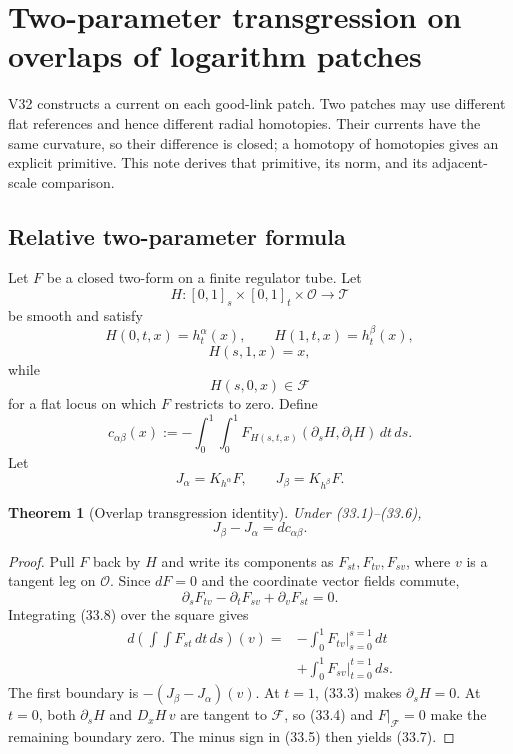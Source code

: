 \documentclass[11pt]{article}
\newtheorem{theorem}{Theorem}[section]
\begin{document}
\section{Two-parameter transgression on overlaps of logarithm patches}
\label{sec:v11v33}

V32 constructs a current on each good-link patch.  Two patches may use
different flat references and hence different radial homotopies.  Their
currents have the same curvature, so their difference is closed; a
homotopy of homotopies gives an explicit primitive.  This note derives
that primitive, its norm, and its adjacent-scale comparison.

\subsection{Relative two-parameter formula}

Let \(F\) be a closed two-form on a finite regulator tube.  Let
\[
 H:[0,1]_s\times[0,1]_t\times\mathcal O\longrightarrow\mathcal T
 \tag{33.1}
\]
be smooth and satisfy
\[
 H(0,t,x)=h^\alpha_t(x),\qquad
 H(1,t,x)=h^\beta_t(x),
 \tag{33.2}
\]
\[
 H(s,1,x)=x,
 \tag{33.3}
\]
while
\[
 H(s,0,x)\in\mathcal F
 \tag{33.4}
\]
for a flat locus on which \(F\) restricts to zero.  Define
\[
 c_{\alpha\beta}(x)
 :=
 -\int_0^1\int_0^1
 F_{H(s,t,x)}
 \left(\partial_sH,\partial_tH\right)\,dt\,ds.
 \tag{33.5}
\]
Let
\[
 J_\alpha=K_{h^\alpha}F,\qquad
 J_\beta=K_{h^\beta}F.
 \tag{33.6}
\]

\begin{theorem}[Overlap transgression identity]
\label{thm:v11v33-overlap}
Under (33.1)--(33.6),
\[
 J_\beta-J_\alpha=dc_{\alpha\beta}.
 \tag{33.7}
\]
\end{theorem}

\begin{proof}
Pull \(F\) back by \(H\) and write its components as
\(F_{st},F_{tv},F_{sv}\), where \(v\) is a tangent leg on
\(\mathcal O\).  Since \(dF=0\) and the coordinate vector fields commute,
\[
 \partial_sF_{tv}-\partial_tF_{sv}+\partial_vF_{st}=0.
 \tag{33.8}
\]
Integrating (33.8) over the square gives
\[
 \begin{split}
 d\!\left(\int\!\!\int F_{st}\,dt\,ds\right)(v)
 ={}&
 -\int_0^1
 \left.F_{tv}\right|_{s=0}^{s=1}\,dt\\
 &+\int_0^1
 \left.F_{sv}\right|_{t=0}^{t=1}\,ds.
 \end{split}
 \tag{33.9}
\]
The first boundary is \(-(J_\beta-J_\alpha)(v)\).  At \(t=1\),
(33.3) makes \(\partial_sH=0\).  At \(t=0\), both
\(\partial_sH\) and \(D_xH\,v\) are tangent to \(\mathcal F\), so
(33.4) and \(F|_{\mathcal F}=0\) make the remaining boundary zero.
The minus sign in (33.5) then yields (33.7).
\end{proof}
\end{document}
